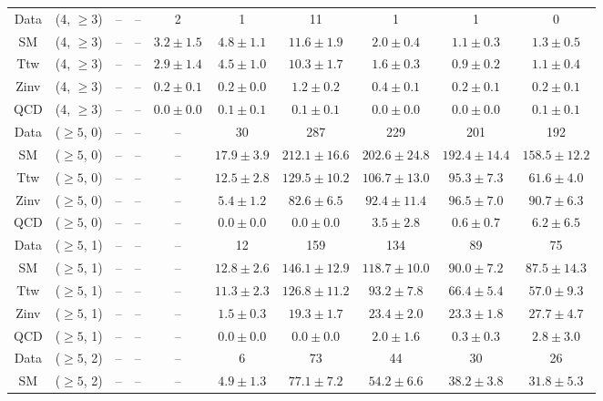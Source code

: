 \begin{table}[h!]
{\begin{tabular}{cccccccccc}
	Data & (4, $\ge3$) & -- & -- & 2 & 1 & 11 & 1 & 1 & 0 \\[0.5ex] 
	SM & (4, $\ge3$) & -- & -- & $3.2\pm 1.5$ & $4.8\pm 1.1$ & $11.6\pm 1.9$ & $2.0\pm 0.4$ & $1.1\pm 0.3$ & $1.3\pm 0.5$ \\[0.5ex] 
	Ttw & (4, $\ge3$) & -- & -- & $2.9\pm 1.4$ & $4.5\pm 1.0$ & $10.3\pm 1.7$ & $1.6\pm 0.3$ & $0.9\pm 0.2$ & $1.1\pm 0.4$ \\[0.5ex] 
	Zinv & (4, $\ge3$) & -- & -- & $0.2\pm 0.1$ & $0.2\pm 0.0$ & $1.2\pm 0.2$ & $0.4\pm 0.1$ & $0.2\pm 0.1$ & $0.2\pm 0.1$ \\[0.5ex] 
	QCD & (4, $\ge3$) & -- & -- & $0.0\pm 0.0$ & $0.1\pm 0.1$ & $0.1\pm 0.1$ & $0.0\pm 0.0$ & $0.0\pm 0.0$ & $0.1\pm 0.1$ \\[0.5ex] 
	Data & ($\ge5$, 0) & -- & -- & -- & 30 & 287 & 229 & 201 & 192 \\[0.5ex] 
	SM & ($\ge5$, 0) & -- & -- & -- & $17.9\pm 3.9$ & $212.1\pm 16.6$ & $202.6\pm 24.8$ & $192.4\pm 14.4$ & $158.5\pm 12.2$ \\[0.5ex] 
	Ttw & ($\ge5$, 0) & -- & -- & -- & $12.5\pm 2.8$ & $129.5\pm 10.2$ & $106.7\pm 13.0$ & $95.3\pm 7.3$ & $61.6\pm 4.0$ \\[0.5ex] 
	Zinv & ($\ge5$, 0) & -- & -- & -- & $5.4\pm 1.2$ & $82.6\pm 6.5$ & $92.4\pm 11.4$ & $96.5\pm 7.0$ & $90.7\pm 6.3$ \\[0.5ex] 
	QCD & ($\ge5$, 0) & -- & -- & -- & $0.0\pm 0.0$ & $0.0\pm 0.0$ & $3.5\pm 2.8$ & $0.6\pm 0.7$ & $6.2\pm 6.5$ \\[0.5ex] 
	Data & ($\ge5$, 1) & -- & -- & -- & 12 & 159 & 134 & 89 & 75 \\[0.5ex] 
	SM & ($\ge5$, 1) & -- & -- & -- & $12.8\pm 2.6$ & $146.1\pm 12.9$ & $118.7\pm 10.0$ & $90.0\pm 7.2$ & $87.5\pm 14.3$ \\[0.5ex] 
	Ttw & ($\ge5$, 1) & -- & -- & -- & $11.3\pm 2.3$ & $126.8\pm 11.2$ & $93.2\pm 7.8$ & $66.4\pm 5.4$ & $57.0\pm 9.3$ \\[0.5ex] 
	Zinv & ($\ge5$, 1) & -- & -- & -- & $1.5\pm 0.3$ & $19.3\pm 1.7$ & $23.4\pm 2.0$ & $23.3\pm 1.8$ & $27.7\pm 4.7$ \\[0.5ex] 
	QCD & ($\ge5$, 1) & -- & -- & -- & $0.0\pm 0.0$ & $0.0\pm 0.0$ & $2.0\pm 1.6$ & $0.3\pm 0.3$ & $2.8\pm 3.0$ \\[0.5ex] 
	Data & ($\ge5$, 2) & -- & -- & -- & 6 & 73 & 44 & 30 & 26 \\[0.5ex] 
	SM & ($\ge5$, 2) & -- & -- & -- & $4.9\pm 1.3$ & $77.1\pm 7.2$ & $54.2\pm 6.6$ & $38.2\pm 3.8$ & $31.8\pm 5.3$ \\[0.5ex] 

\end{tabular}}
\end{table}
